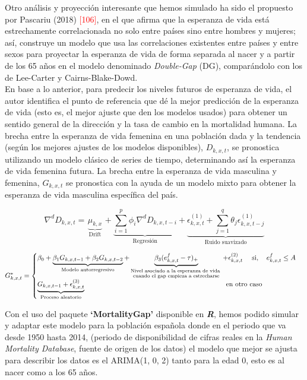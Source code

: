 Otro análisis y proyección interesante que hemos simulado ha sido el propuesto por Pascariu (2018) \textcolor{red}{[106]}, en el que afirma que la esperanza de vida está estrechamente correlacionada no solo entre países sino entre hombres y mujeres; así, construye un modelo que usa las correlaciones existentes entre países y entre sexos para proyectar la esperanza de vida de forma separada al nacer y a partir de los 65 años en el modelo denominado \textit{Double-Gap} (DG), comparándolo con los de Lee-Carter y Cairns-Blake-Dowd.\\

En base a lo anterior, para predecir los niveles futuros de esperanza de vida, el autor identifica el punto de referencia que dé la mejor predicción de la esperanza de vida (esto es, el mejor ajuste que den los modelos usados) para obtener un sentido general de la dirección y la tasa de cambio en la mortalidad humana. La brecha entre la esperanza de vida femenina en una población dada y la tendencia (según los mejores ajustes de los modelos disponibles), $D_{k,x,t}$, se pronostica utilizando un modelo clásico de series de tiempo, determinando así la esperanza de vida femenina futura. La brecha entre la esperanza de vida masculina y femenina, $G_{k,x,t}$ se pronostica con la ayuda de un modelo mixto para obtener la esperanza de vida masculina específica del país.

 $$\nabla^{d} D_{k, x, t}=\underbrace{\mu_{k, x}}_{\text { Drift }}+\underbrace{\sum_{i=1}^{p} \phi_{i} \nabla^{d} D_{k, x, t-i}}_{\text { Regresión }}+\underbrace{\epsilon_{k, x, t}^{(1)}+\sum_{j=1}^{q} \theta_{j} \epsilon_{k, x, t-j}^{(1)}}_{\text { Ruido suavizado }}$$

\[
    G_{k,x,t}^{*}= \begin{cases}
                  \beta_{0}+\underbrace{\beta_{1} G_{k, x, t-1}+\beta_{2} G_{k, x, t-2}}_{\text { Modelo autorregresivo }}+\underbrace{\beta_{3}(e_{k, x, t}^{f}-\tau)_{+}}_{\substack{\text {Nivel asociado a la esperanza de vida }\\ \text{cuando el gap empieza a estrecharse}}}+\epsilon_{k, x, t}^{(2)} \quad \text { si, }\hspace{0.3cm} e_{k, x, t}^{f} \leq A\\
                 \underbrace{G_{k, x, t-1}+\epsilon_{k, x, t}^{(3)}}_{\text { Proceso aleatorio }}\ \  \hspace{7cm} \text{en otro caso}
                \end{cases} 
  \]

Con el uso del paquete \textbf{`MortalityGap'} disponible en \textit{\textbf{R}}, hemos podido simular y adaptar este modelo para la población española donde en el periodo que va desde 1950 hasta 2014, (periodo de disponibilidad de cifras reales en la \textit{Human Mortality Database}, fuente de origen de los datos) el modelo que mejor se ajusta para describir los datos es el ARIMA(1, 0, 2) tanto para la edad 0, esto es al nacer como a los 65 años.\\

